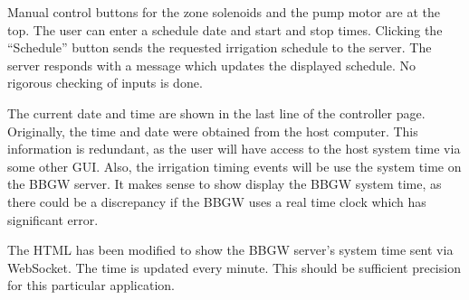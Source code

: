 Manual control buttons for the zone solenoids and the pump motor are at the 
top.  The user can enter a schedule date and start and stop times.  Clicking 
the ``Schedule'' button sends the requested irrigation schedule to the server.  
The server responds with a message which updates the displayed schedule.  No 
rigorous checking of inputs is done.

The current date and time are shown in the last line of the controller page.
Originally, the time and date were obtained from the host computer.  This
information is redundant, as the user will have access to the host system time
via some other GUI.  Also, the irrigation timing events will be use the system
time on the BBGW server.  It makes sense to show display the BBGW system time, as
there could be a discrepancy if the BBGW uses a real time clock which has significant
error.

The HTML has been modified to show the BBGW server's system time sent via WebSocket.
The time is updated every minute.  This should be sufficient precision for this
particular application.

